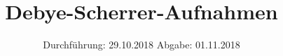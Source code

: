 


\subject{Versuch Nr.48}
\title{Debye-Scherrer-Aufnahmen}
\date{
  Durchführung: 29.10.2018
  \hspace{3em}
  Abgabe: 01.11.2018
}




\maketitle
\thispagestyle{plain}
\tableofcontents
\newpage



\newpage

\newpage

\newpage

\newpage

\printbibliography
\newpage



